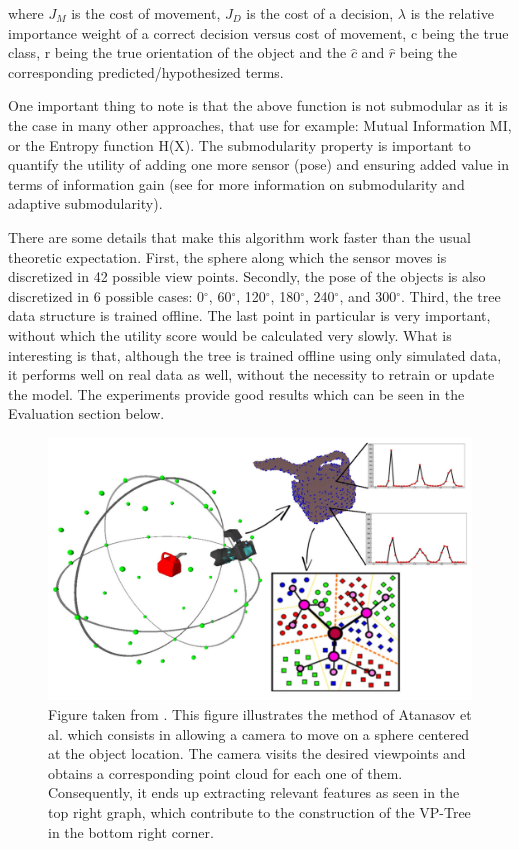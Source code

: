 \documentclass[a4paper,11pt,english]{article}
\begin{document}
where $J_M$ is the cost of movement, $J_D$ is the cost of a decision, $\lambda$ is the relative importance weight of a correct decision versus cost of movement, c being the true class, r being the true orientation of the object and the $\hat{c}$ and $\hat{r}$ being the corresponding predicted/hypothesized terms.

One important thing to note is that the above function is not submodular as it is the case in many other approaches, that use for example: Mutual Information MI, or the Entropy function H(X). The submodularity property is important to quantify the utility of adding one more sensor (pose) and ensuring added value in terms of information gain (see \cite{golovin2011adaptive} for more information on submodularity and adaptive submodularity). 

There are some details that make this algorithm work faster than the usual theoretic expectation. First, the sphere along which the sensor moves is discretized in 42 possible view points. Secondly, the pose of the objects is also discretized in 6 possible cases: 0$^{\circ}$, 60$^{\circ}$, 120$^{\circ}$, 180$^{\circ}$, 240$^{\circ}$, and 300$^{\circ}$. Third, the tree data structure is trained offline. The last point in particular is very important, without which the utility score would be calculated very slowly. What is interesting is that, although the tree is trained offline using only simulated data, it performs well on real data as well, without the necessity to retrain or update the model. The experiments provide good results which can be seen in the Evaluation section below.

\begin{figure}[t!]

  
  \centering
    \includegraphics[scale=0.1]{atanasovmethod1_highres.jpg}
    \caption{ Figure taken from \cite{atanasov2014nonmyopic}.
  This figure illustrates the method of Atanasov et al. \cite{atanasov2014nonmyopic} which consists in allowing a camera to move on a sphere centered at the object location. The camera visits the desired viewpoints and obtains a corresponding point cloud for each one of them. Consequently, it ends up extracting relevant features as seen in the top right graph, which contribute to the construction of the VP-Tree in the bottom right corner. }
  
  \label{atanasovmethod1}
\end{figure}
\end{document}
